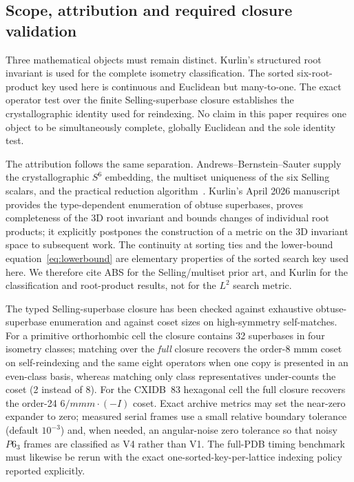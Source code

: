 \documentclass[11pt]{article}
\begin{document}
\subsection{Scope, attribution and required closure validation}

Three mathematical objects must remain distinct. Kurlin's structured root invariant is used for the complete isometry classification. The sorted six-root-product key used here is continuous and Euclidean but many-to-one. The exact operator test over the finite Selling-superbase closure establishes the crystallographic identity used for reindexing. No claim in this paper requires one object to be simultaneously complete, globally Euclidean and the sole identity test.

The attribution follows the same separation. Andrews--Bernstein--Sauter supply the crystallographic $S^6$ embedding, the multiset uniqueness of the six Selling scalars, and the practical reduction algorithm~\cite{ab1988,abs2019,ab2023}. Kurlin's April 2026 manuscript provides the type-dependent enumeration of obtuse superbases, proves completeness of the 3D root invariant and bounds changes of individual root products; it explicitly postpones the construction of a metric on the 3D invariant space to subsequent work. The continuity at sorting ties and the lower-bound equation~\eqref{eq:lowerbound} are elementary properties of the sorted search key used here. We therefore cite ABS for the Selling/multiset prior art, and Kurlin for the classification and root-product results, not for the $L^2$ search metric.

The typed Selling-superbase closure has been checked against exhaustive obtuse-superbase enumeration and against coset sizes on high-symmetry self-matches. For a primitive orthorhombic cell the closure contains 32 superbases in four isometry classes; matching over the \emph{full} closure recovers the order-8 mmm coset on self-reindexing and the same eight operators when one copy is presented in an even-class basis, whereas matching only class representatives under-counts the coset (2 instead of 8). For the CXIDB~83 hexagonal cell the full closure recovers the order-24 $6/mmm{\cdot}(-I)$ coset. Exact archive metrics may set the near-zero expander to zero; measured serial frames use a small relative boundary tolerance (default $10^{-3}$) and, when needed, an angular-noise zero tolerance so that noisy $P6_3$ frames are classified as V4 rather than V1. The full-PDB timing benchmark must likewise be rerun with the exact one-sorted-key-per-lattice indexing policy reported explicitly.
\end{document}

